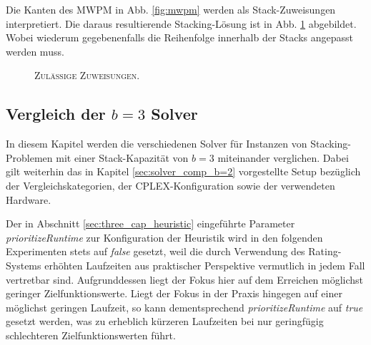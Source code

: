 Die Kanten des \textsc{MWPM} in Abb. \ref{fig:mwpm} werden als Stack-Zuweisungen interpretiert.
Die daraus resultierende Stacking-Lösung ist in Abb. \ref{fig:valid_solution} abgebildet. Wobei wiederum gegebenenfalls die Reihenfolge
innerhalb der Stacks angepasst werden muss.

\begin{figure}[H]
  \centering
    \caption{\textsc{Zulässige Zuweisungen.}}
    \label{fig:valid_solution}
\end{figure}

\subsection{Vergleich der $b = 3$ Solver}
\label{sec:solver_comp_b=3}

In diesem Kapitel werden die verschiedenen Solver für Instanzen von Stacking-Problemen mit einer Stack-Kapazität
von $b = 3$ miteinander verglichen. Dabei gilt weiterhin das in Kapitel \ref{sec:solver_comp_b=2} vorgestellte Setup
bezüglich der Vergleichskategorien, der \textsc{CPLEX}-Konfiguration sowie der verwendeten Hardware.

Der in Abschnitt \ref{sec:three_cap_heuristic} eingeführte Parameter \textit{prioritizeRuntime} zur Konfiguration der Heuristik
wird in den folgenden Experimenten stets auf \textit{false} gesetzt, weil die durch Verwendung des Rating-Systems erhöhten Laufzeiten
aus praktischer Perspektive vermutlich in jedem Fall vertretbar sind. Aufgrunddessen liegt der Fokus hier auf dem Erreichen
möglichst geringer Zielfunktionswerte. Liegt der Fokus in der Praxis hingegen auf einer möglichst geringen Laufzeit, so kann dementsprechend
\textit{prioritizeRuntime} auf \textit{true} gesetzt werden, was zu erheblich kürzeren Laufzeiten bei nur geringfügig schlechteren
Zielfunktionswerten führt.

